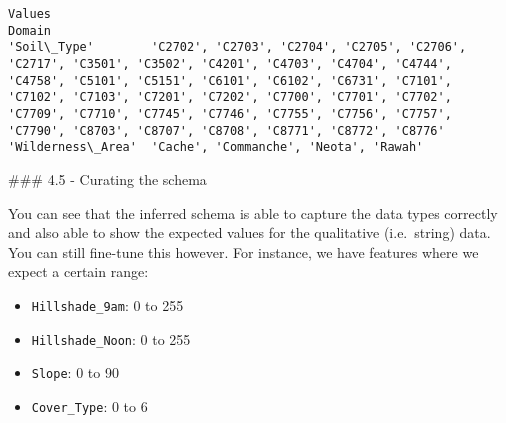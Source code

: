 \documentclass[11pt]{article}
\providecommand{\tightlist}{%
      \setlength{\itemsep}{0pt}\setlength{\parskip}{0pt}}
\begin{document}
    
    
    \begin{Verbatim}[commandchars=\\\{\}]
                                                                                                                                                                                                                                                                                                                                                                                   Values
Domain                                                                                                                                                                                                                                                                                                                                                                                   
'Soil\_Type'        'C2702', 'C2703', 'C2704', 'C2705', 'C2706', 'C2717', 'C3501', 'C3502', 'C4201', 'C4703', 'C4704', 'C4744', 'C4758', 'C5101', 'C5151', 'C6101', 'C6102', 'C6731', 'C7101', 'C7102', 'C7103', 'C7201', 'C7202', 'C7700', 'C7701', 'C7702', 'C7709', 'C7710', 'C7745', 'C7746', 'C7755', 'C7756', 'C7757', 'C7790', 'C8703', 'C8707', 'C8708', 'C8771', 'C8772', 'C8776'
'Wilderness\_Area'  'Cache', 'Commanche', 'Neota', 'Rawah'                                                                                                                                                                                                                                                                                                                                
    \end{Verbatim}

    
    \#\#\# 4.5 - Curating the schema

You can see that the inferred schema is able to capture the data types
correctly and also able to show the expected values for the qualitative
(i.e.~string) data. You can still fine-tune this however. For instance,
we have features where we expect a certain range:

\begin{itemize}
\tightlist
\item
  \texttt{Hillshade\_9am}: 0 to 255
\item
  \texttt{Hillshade\_Noon}: 0 to 255
\item
  \texttt{Slope}: 0 to 90
\item
  \texttt{Cover\_Type}: 0 to 6
\end{itemize}
\end{document}
